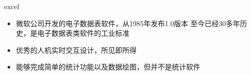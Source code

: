 \documentclass{beamerthemeMono}
\begin{document}
\begin{frame}[t]{\subsecname}{excel}
\begin{itemize}
\item<1-> 微软公司开发的电子数据表软件，从1985年发布1.0版本
    至今已经30多年历史，是电子数据表类软件的工业标准
\item<2-> 优秀的人机实时交互设计，所见即所得
\item<3-> 能够完成简单的统计功能以及数据绘图，但并不是统计软件
\end{itemize}

\begin{overlayarea}{\textwidth}{\textheight} 

  

\end{overlayarea}
\end{frame}
\end{document}
